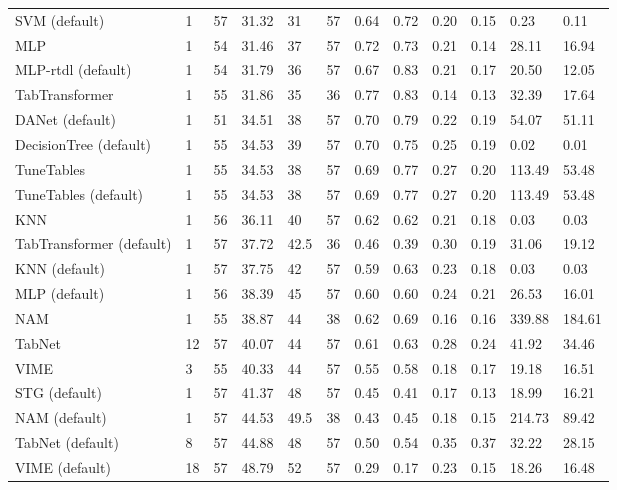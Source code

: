 \begin{tabular}{lllllrllllll}
SVM (default) & 1 & 57 & 31.32 & 31 & 57 & 0.64 & 0.72 & 0.20 & 0.15 & 0.23 & 0.11 \\
MLP & 1 & 54 & 31.46 & 37 & 57 & 0.72 & 0.73 & 0.21 & 0.14 & 28.11 & 16.94 \\
MLP-rtdl (default) & 1 & 54 & 31.79 & 36 & 57 & 0.67 & 0.83 & 0.21 & 0.17 & 20.50 & 12.05 \\
TabTransformer & 1 & 55 & 31.86 & 35 & 36 & 0.77 & 0.83 & 0.14 & 0.13 & 32.39 & 17.64 \\
DANet (default) & 1 & 51 & 34.51 & 38 & 57 & 0.70 & 0.79 & 0.22 & 0.19 & 54.07 & 51.11 \\
DecisionTree (default) & 1 & 55 & 34.53 & 39 & 57 & 0.70 & 0.75 & 0.25 & 0.19 & 0.02 & 0.01 \\
TuneTables & 1 & 55 & 34.53 & 38 & 57 & 0.69 & 0.77 & 0.27 & 0.20 & 113.49 & 53.48 \\
TuneTables (default) & 1 & 55 & 34.53 & 38 & 57 & 0.69 & 0.77 & 0.27 & 0.20 & 113.49 & 53.48 \\
KNN & 1 & 56 & 36.11 & 40 & 57 & 0.62 & 0.62 & 0.21 & 0.18 & 0.03 & 0.03 \\
TabTransformer (default) & 1 & 57 & 37.72 & 42.5 & 36 & 0.46 & 0.39 & 0.30 & 0.19 & 31.06 & 19.12 \\
KNN (default) & 1 & 57 & 37.75 & 42 & 57 & 0.59 & 0.63 & 0.23 & 0.18 & 0.03 & 0.03 \\
MLP (default) & 1 & 56 & 38.39 & 45 & 57 & 0.60 & 0.60 & 0.24 & 0.21 & 26.53 & 16.01 \\
NAM & 1 & 55 & 38.87 & 44 & 38 & 0.62 & 0.69 & 0.16 & 0.16 & 339.88 & 184.61 \\
TabNet & 12 & 57 & 40.07 & 44 & 57 & 0.61 & 0.63 & 0.28 & 0.24 & 41.92 & 34.46 \\
VIME & 3 & 55 & 40.33 & 44 & 57 & 0.55 & 0.58 & 0.18 & 0.17 & 19.18 & 16.51 \\
STG (default) & 1 & 57 & 41.37 & 48 & 57 & 0.45 & 0.41 & 0.17 & 0.13 & 18.99 & 16.21 \\
NAM (default) & 1 & 57 & 44.53 & 49.5 & 38 & 0.43 & 0.45 & 0.18 & 0.15 & 214.73 & 89.42 \\
TabNet (default) & 8 & 57 & 44.88 & 48 & 57 & 0.50 & 0.54 & 0.35 & 0.37 & 32.22 & 28.15 \\
VIME (default) & 18 & 57 & 48.79 & 52 & 57 & 0.29 & 0.17 & 0.23 & 0.15 & 18.26 & 16.48 \\
\bottomrule
\end{tabular}
